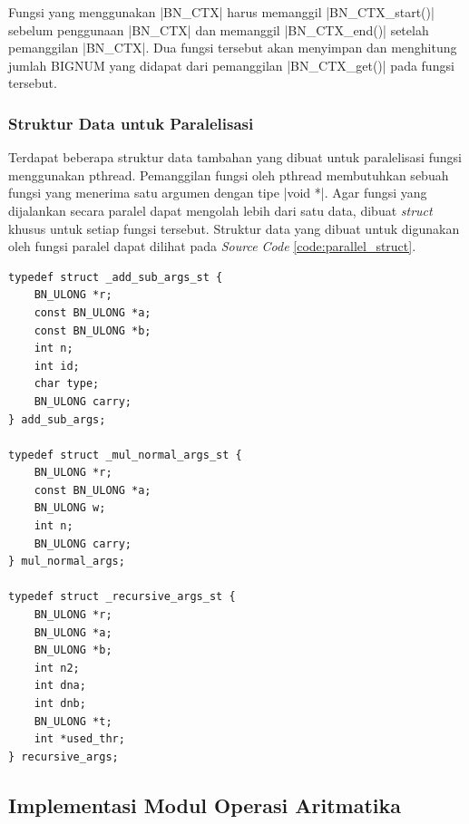     Fungsi yang menggunakan |BN_CTX| harus memanggil |BN_CTX_start()| sebelum penggunaan |BN_CTX| dan memanggil |BN_CTX_end()| setelah pemanggilan |BN_CTX|. Dua fungsi tersebut akan menyimpan dan menghitung jumlah BIGNUM yang didapat dari pemanggilan |BN_CTX_get()| pada fungsi tersebut.

    \subsubsection{Struktur Data untuk Paralelisasi}
    Terdapat beberapa struktur data tambahan yang dibuat untuk paralelisasi fungsi menggunakan pthread. Pemanggilan fungsi oleh pthread membutuhkan sebuah fungsi yang menerima satu argumen dengan tipe |void *|. Agar fungsi yang dijalankan secara paralel dapat mengolah lebih dari satu data, dibuat \textit{struct} khusus untuk setiap fungsi tersebut. Struktur data yang dibuat untuk digunakan oleh fungsi paralel dapat dilihat pada \textit{Source Code} \ref{code:parallel_struct}.

    \begin{lstlisting}[caption={Struktur Data Paralelisasi}, label={code:parallel_struct}]
typedef struct _add_sub_args_st {
    BN_ULONG *r;
    const BN_ULONG *a;
    const BN_ULONG *b;
    int n;
    int id;
    char type;
    BN_ULONG carry;
} add_sub_args;

typedef struct _mul_normal_args_st {
    BN_ULONG *r;
    const BN_ULONG *a;
    BN_ULONG w;
    int n;
    BN_ULONG carry;
} mul_normal_args;

typedef struct _recursive_args_st {
    BN_ULONG *r;
    BN_ULONG *a;
    BN_ULONG *b;
    int n2;
    int dna;
    int dnb;
    BN_ULONG *t;
    int *used_thr;
} recursive_args;
    \end{lstlisting}

  \subsection{Implementasi Modul Operasi Aritmatika}

    
    
    
    
